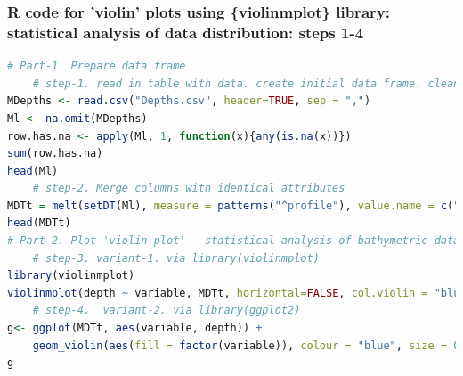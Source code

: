 \documentclass[pdflatex,compress,10pt,
	xcolor={dvipsnames,dvipsnames,svgnames,x11names,table},
	hyperref={colorlinks = true,breaklinks = true, urlcolor = NavyBlue, breaklinks = true}]{beamer}
\begin{document}
\begin{frame}[fragile]\frametitle{R code for 'violin' plots using \{violinmplot\} library: statistical analysis of data distribution: steps 1-4}
\begin{lstlisting}[language=R]
# Part-1. Prepare data frame
	# step-1. read in table with data. create initial data frame. clean data frame from the NA
MDepths <- read.csv("Depths.csv", header=TRUE, sep = ",")
Ml <- na.omit(MDepths) 
row.has.na <- apply(Ml, 1, function(x){any(is.na(x))}) 
sum(row.has.na) 
head(Ml)
	# step-2. Merge columns with identical attributes
MDTt = melt(setDT(Ml), measure = patterns("^profile"), value.name = c("depth"))
head(MDTt)
# Part-2. Plot 'violin plot' - statistical analysis of bathymetric data distribution (mean, standard deviation, median).
	# step-3. variant-1. via library(violinmplot) 	
library(violinmplot) 
violinmplot(depth ~ variable, MDTt, horizontal=FALSE, col.violin = "blue", main = "Violin plot of the Mariana Trench: a hybrid of a Box plot and a Kernel probability density estimation plot (rotated) + median")
	# step-4.  variant-2. via library(ggplot2) 	
g<- ggplot(MDTt, aes(variable, depth)) +    
	geom_violin(aes(fill = factor(variable)), colour = "blue", size = 0.2, draw_quantiles = c(0.25, 0.5, 0.75), alpha = 0.5, scale = "count", trim = FALSE)
g
\end{lstlisting}
\end{frame}
\end{document}

